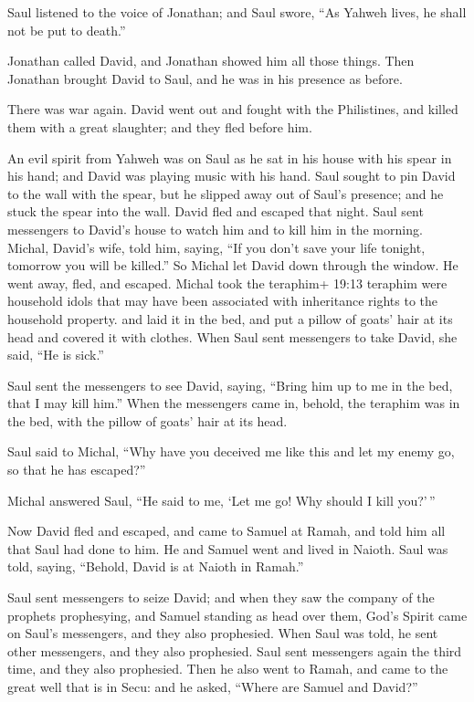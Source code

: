  Saul listened to the voice of Jonathan; and Saul swore,
``As Yahweh lives, he shall not be put to death.''

 Jonathan called David, and Jonathan showed him all those
things. Then Jonathan brought David to Saul, and he was in his presence
as before.

 There was war again. David went out and fought with the
Philistines, and killed them with a great slaughter; and they fled
before him.

 An evil spirit from Yahweh was on Saul as he sat in his
house with his spear in his hand; and David was playing music with his
hand.  Saul sought to pin David to the wall with the spear,
but he slipped away out of Saul's presence; and he stuck the spear into
the wall. David fled and escaped that night.  Saul sent
messengers to David's house to watch him and to kill him in the morning.
Michal, David's wife, told him, saying, ``If you don't save your life
tonight, tomorrow you will be killed.''  So Michal let
David down through the window. He went away, fled, and escaped.
 Michal took the teraphim+ 19:13 teraphim were household
idols that may have been associated with inheritance rights to the
household property. and laid it in the bed, and put a pillow of goats'
hair at its head and covered it with clothes.  When Saul
sent messengers to take David, she said, ``He is sick.''

 Saul sent the messengers to see David, saying, ``Bring him
up to me in the bed, that I may kill him.''  When the
messengers came in, behold, the teraphim was in the bed, with the pillow
of goats' hair at its head.

 Saul said to Michal, ``Why have you deceived me like this
and let my enemy go, so that he has escaped?''

Michal answered Saul, ``He said to me, `Let me go! Why should I kill
you?'\,''

 Now David fled and escaped, and came to Samuel at Ramah,
and told him all that Saul had done to him. He and Samuel went and lived
in Naioth.  Saul was told, saying, ``Behold, David is at
Naioth in Ramah.''

 Saul sent messengers to seize David; and when they saw the
company of the prophets prophesying, and Samuel standing as head over
them, God's Spirit came on Saul's messengers, and they also prophesied.
 When Saul was told, he sent other messengers, and they
also prophesied. Saul sent messengers again the third time, and they
also prophesied.  Then he also went to Ramah, and came to
the great well that is in Secu: and he asked, ``Where are Samuel and
David?''


